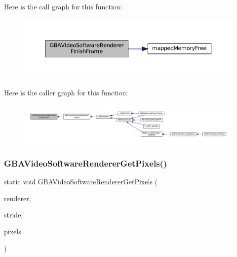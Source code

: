 Here is the call graph for this function\+:
\nopagebreak
\begin{figure}[H]
\begin{center}
\leavevmode
\includegraphics[width=350pt]{video-software_8c_ab3f71de0216af2e138ddf948622ffc2f_cgraph}
\end{center}
\end{figure}
Here is the caller graph for this function\+:
\nopagebreak
\begin{figure}[H]
\begin{center}
\leavevmode
\includegraphics[width=350pt]{video-software_8c_ab3f71de0216af2e138ddf948622ffc2f_icgraph}
\end{center}
\end{figure}
\mbox{\label{video-software_8c_a1f3ab2c0fe8d2b4179230c474a0e8ee8}} 
\subsubsection{\texorpdfstring{G\+B\+A\+Video\+Software\+Renderer\+Get\+Pixels()}{GBAVideoSoftwareRendererGetPixels()}}
{\footnotesize\ttfamily static void G\+B\+A\+Video\+Software\+Renderer\+Get\+Pixels (\begin{DoxyParamCaption}\item[{struct G\+B\+A\+Video\+Renderer $\ast$}]{renderer,  }\item[{size\+\_\+t $\ast$}]{stride,  }\item[{const void $\ast$$\ast$}]{pixels }\end{DoxyParamCaption})\hspace{0.3cm}{\ttfamily [static]}}


